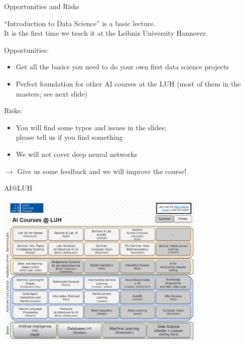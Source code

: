 \documentclass[aspectratio=169]{../latex_main/tntbeamer}  %
\begin{document}
\begin{frame}[c]{Opportunities and Risks}

``Introduction to Data Science'' is a basic lecture.\\ It is the first time we teach it at the Leibniz University Hannover.

\bigskip
\pause

Opportunities:
\begin{itemize}
  \item Get all the basics you need to do your own first data science projects
  \item Perfect foundation for other AI courses at the LUH (most of them in the masters; see next slide)
\end{itemize}

\medskip

Risks:
\begin{itemize}
  \item You will find some typos and issues in the slides;\\ please tell us if you find something
  \item We will not cover deep neural networks
\end{itemize}

\medskip
$\to$ Give us some feedback and we will improve the course!

\end{frame}
\begin{frame}[c]{AI@LUH}

\centering
\vspace{-1.3cm}
\includegraphics[width=0.75\textwidth]{00_Orga/figures/ai_luh.PNG}

\end{frame}
\end{document}
